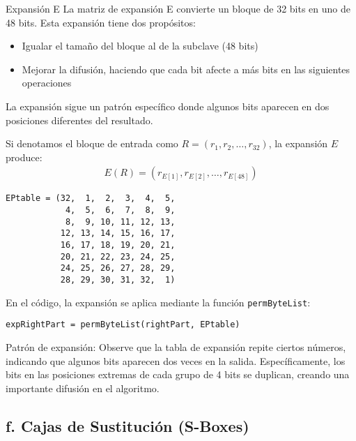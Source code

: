 \begin{cryptomethod}{Expansión E}
La matriz de expansión E convierte un bloque de 32 bits en uno de 48 bits. Esta expansión tiene dos propósitos:
\begin{itemize}
    \item Igualar el tamaño del bloque al de la subclave (48 bits)
    \item Mejorar la difusión, haciendo que cada bit afecte a más bits en las siguientes operaciones
\end{itemize}

La expansión sigue un patrón específico donde algunos bits aparecen en dos posiciones diferentes del resultado.

Si denotamos el bloque de entrada como $R = (r_1, r_2, \ldots, r_{32})$, la expansión $E$ produce:
\begin{align}
E(R) = (r_{E[1]}, r_{E[2]}, \ldots, r_{E[48]})
\end{align}
\end{cryptomethod}

\begin{lstlisting}[style=cryptoalgo, caption={Matriz de Expansión E}, label=lst:expansion]
EPtable = (32,  1,  2,  3,  4,  5,
            4,  5,  6,  7,  8,  9,
            8,  9, 10, 11, 12, 13,
           12, 13, 14, 15, 16, 17,
           16, 17, 18, 19, 20, 21,
           20, 21, 22, 23, 24, 25,
           24, 25, 26, 27, 28, 29,
           28, 29, 30, 31, 32,  1)
\end{lstlisting}

En el código, la expansión se aplica mediante la función \texttt{permByteList}:

\begin{lstlisting}[style=cryptoalgo]
expRightPart = permByteList(rightPart, EPtable)
\end{lstlisting}

\begin{securitygoodpractice}
Patrón de expansión: Observe que la tabla de expansión repite ciertos números, indicando que algunos bits aparecen dos veces en la salida. Específicamente, los bits en las posiciones extremas de cada grupo de 4 bits se duplican, creando una importante difusión en el algoritmo.
\end{securitygoodpractice}

\subsection{f. Cajas de Sustitución (S-Boxes)}

